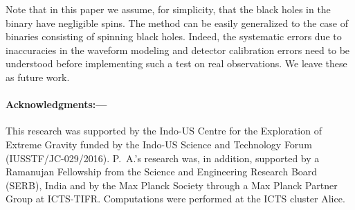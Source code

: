 \documentclass[prl,preprintnumbers,twocolumn,eqsecnum,floatfix,a4paper,nofootinbib,superscriptaddress]{revtex4}
\begin{document}
Note that in this paper we assume, for simplicity, that the black holes in the binary have negligible spins. The method can be easily generalized to the case of binaries consisting of spinning black holes. Indeed, the systematic errors due to inaccuracies in the waveform modeling and detector calibration errors need to be understood before implementing such a test on real observations. We leave these as future work. 

\paragraph{Acknowledgments:---}
This research was supported by the Indo-US Centre for the Exploration of Extreme Gravity funded by the Indo-US Science and Technology Forum (IUSSTF/JC-029/2016). P.~A.'s research was, in addition, supported by a Ramanujan Fellowship from the Science and Engineering Research Board (SERB), India and by the Max Planck Society through a Max Planck Partner Group at ICTS-TIFR. Computations were performed at the ICTS cluster Alice. 
%


\end{document}
